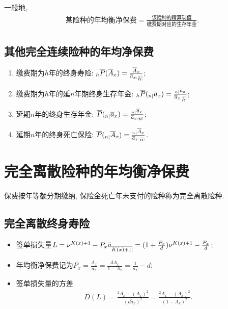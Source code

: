 \documentclass[lang=cn,10pt]{elegantbook}
\makeatletter
\DeclareRobustCommand{\annu}[1]{_{%
    \def\arraystretch{0}%
    \setlength\arraycolsep{1pt}%
    \setlength\arrayrulewidth{.2pt}%
    \begin{array}[b]{@{}c|}\hline
        \\[\arraycolsep]%
        \scriptstyle #1%
    \end{array}%
}}
\makeatother
\begin{document}
\begin{remark}
    一般地,
    \begin{align*}
        \text{某险种的年均衡净保费}=\frac{\text{该险种的精算现值}}{\text{缴费期对应的生存年金}}.
    \end{align*}
\end{remark}

\subsection{其他完全连续险种的年均净保费}

\begin{proposition}
    \begin{enumerate}
        \item 缴费期为$h$年的终身寿险: $_{h}\overline{P}(\overline{A}_{x})=\frac{\overline{A}_{x}}{\overline{a}_{x:}{}\annu h}$;
        \item 缴费期为$h$年的延$n$年期终身生存年金: $_{h}\overline{P}(_{n|}\overline{a}_{x})=\frac{_{n|}\overline{a}_{x}}{\overline{a}_{x:}{}{\annu h}}$;
        \item 延期$n$年的终身生存年金: $\overline{P}(_{n|}\overline{a}_{x})=\frac{_{n|}\overline{a}_{x}}{\overline{a}_{x:}{}\annu n}$;
        \item 延期$n$年的终身死亡保险: $\overline{P}(_{n|}\overline{A}_{x})=\frac{_{n|}\overline{A}_{x}}{\overline{a}_{x:}{}\annu n}$.
    \end{enumerate}
\end{proposition}


\section{完全离散险种的年均衡净保费}
\begin{definition}
    保费按年等额分期缴纳, 保险金死亡年末支付的险种称为完全离散险种.
\end{definition}

\subsection{完全离散终身寿险}
\begin{proposition}
    \begin{itemize}
        \item 签单损失量$L=\nu^{K(x)+1}-P_{x}\ddot{a}_{\annu{K(x)+1}}= (1+\frac{P_{x}}{d})\nu^{K(x)+1}-\frac{P_{x}}{d}$;
        \item 年均衡净保费记为$P_{x}=\frac{A_{x}}{\ddot{a}_{x}}=\frac{dA_{x}}{1-A_{x}}=\frac{1}{\ddot{a}_{x}}-d$;
        \item 签单损失量的方差
              \begin{align*}
                  D(L) = \frac{{}^{2}A_{x}-(A_{x})^{2}}{(d\ddot{a}_{x})^{2}}= \frac{{}^{2}A_{x}-(A_{x})^{2}}{(1-A_{x})^{2}}.
              \end{align*}
    \end{itemize}
\end{proposition}
\end{document}
